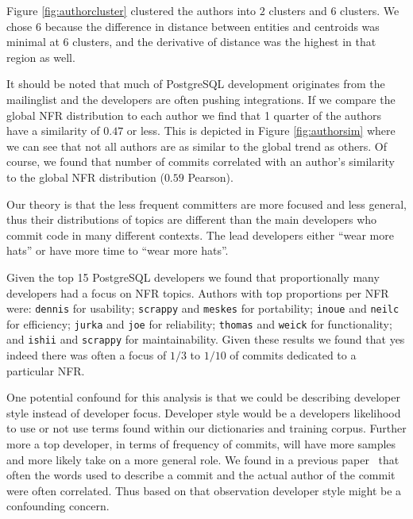 \documentclass[smallextended]{svjour3}       %
\begin{document}
Figure \ref{fig:authorcluster} clustered the authors into $2$ clusters
and $6$ clusters. We chose $6$ because the difference in distance
between entities and centroids was minimal at $6$ clusters, and the
derivative of distance was the highest in that region as well.

It should be noted that much of PostgreSQL development originates from
the mailinglist and the developers are often pushing integrations. If
we compare the global NFR distribution to each author we find that 1
quarter of the authors have a similarity of $0.47$ or less. This is
depicted in Figure \ref{fig:authorsim} where we can see that not all
authors are as similar to the global trend as others. Of course, we
found that number of commits correlated with an author's similarity to the
global NFR distribution ($0.59$ Pearson).


Our theory is that the less frequent committers are more
focused and less general, thus their distributions of topics are
different than the main developers who commit code in many different
contexts.  The lead developers either ``wear more hats'' or have more
time to ``wear more hats''.

Given the top 15 PostgreSQL developers we found that proportionally many
developers had a focus on NFR topics. Authors with top proportions per NFR
were:
\texttt{dennis} for usability; 
\texttt{scrappy} and \texttt{meskes} for portability;
\texttt{inoue} and \texttt{neilc} for efficiency;
\texttt{jurka} and \texttt{joe} for reliability;
\texttt{thomas} and \texttt{weick} for functionality;
and \texttt{ishii} and \texttt{scrappy} for maintainability.
Given these results we found that yes indeed there was often a focus
of $1/3$ to $1/10$ of commits dedicated to a particular NFR.

One potential confound for this analysis is that we could be
describing developer style instead of developer focus. Developer style
would be a developers likelihood to use or not use terms found within
our dictionaries and training corpus. Further more a top developer, in
terms of frequency of commits, will have more samples and more likely
take on a more general role. We found in a previous
paper~\cite{largechanges} that often the words used to describe a commit
and the actual author of the commit were often correlated. Thus based
on that observation developer style might be a confounding concern.


\end{document}
